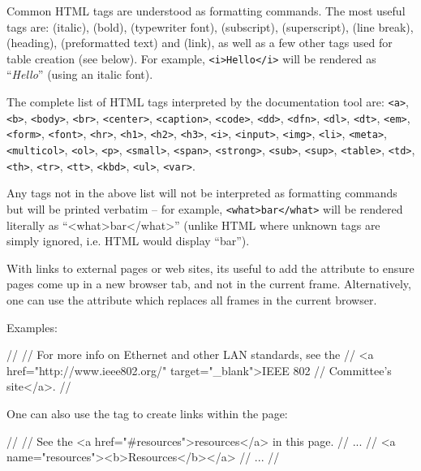 Common HTML tags are understood as formatting commands.
The most useful tags are:  (italic),
 (bold),  (typewriter font),
 (subscript),  (superscript),
 (line break),  (heading),
 (preformatted text) and  (link),
as well as a few other tags used for table creation (see below).
For example, \texttt{<i>Hello</i>} will be rendered as ``\textit{Hello}''
(using an italic font).

The complete list of HTML tags interpreted by the documentation tool are:
\texttt{<a>}, \texttt{<b>}, \texttt{<body>}, \texttt{<br>}, \texttt{<center>},
\texttt{<caption>}, \texttt{<code>}, \texttt{<dd>}, \texttt{<dfn>}, \texttt{<dl>},
\texttt{<dt>}, \texttt{<em>}, \texttt{<form>}, \texttt{<font>}, \texttt{<hr>},
\texttt{<h1>}, \texttt{<h2>}, \texttt{<h3>}, \texttt{<i>}, \texttt{<input>}, \texttt{<img>},
\texttt{<li>}, \texttt{<meta>}, \texttt{<multicol>}, \texttt{<ol>}, \texttt{<p>}, \texttt{<small>},
\texttt{<span>}, \texttt{<strong>},
\texttt{<sub>}, \texttt{<sup>}, \texttt{<table>}, \texttt{<td>}, \texttt{<th>}, \texttt{<tr>},
\texttt{<tt>}, \texttt{<kbd>}, \texttt{<ul>}, \texttt{<var>}.

Any tags not in the above list will not be interpreted as formatting commands
but will be printed verbatim -- for example, \texttt{<what>bar</what>}
will be rendered literally as ``<what>bar</what>'' (unlike HTML where
unknown tags are simply ignored, i.e. HTML would display ``bar'').

With links to external pages or web sites, its useful to add the
 attribute to ensure pages come up in a new browser
tab, and not in the current frame. Alternatively, one can use the
 attribute which replaces all frames in the current
browser.

Examples:

\begin{ned}
//
// For more info on Ethernet and other LAN standards, see the
// <a href="http://www.ieee802.org/" target="_blank">IEEE 802
// Committee's site</a>.
//
\end{ned}

One can also use the  tag to create links within the page:

\begin{ned}
//
// See the <a href="#resources">resources</a> in this page.
// ...
// <a name="resources"><b>Resources</b></a>
// ...
//
\end{ned}

